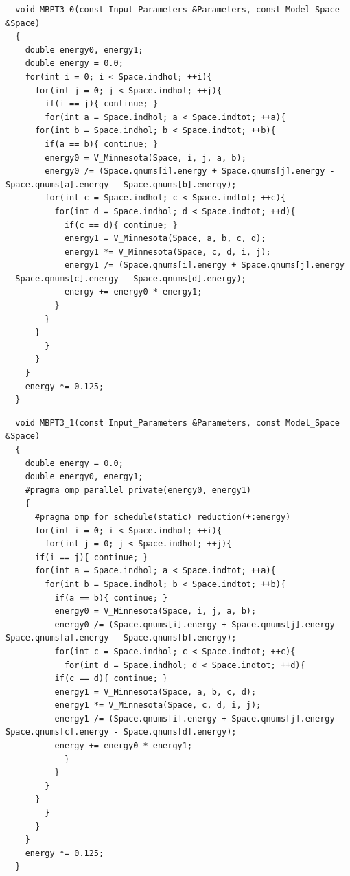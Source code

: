 \begin{lstlisting}
  void MBPT3_0(const Input_Parameters &Parameters, const Model_Space &Space)
  {
    double energy0, energy1;
    double energy = 0.0;
    for(int i = 0; i < Space.indhol; ++i){
      for(int j = 0; j < Space.indhol; ++j){
        if(i == j){ continue; }
        for(int a = Space.indhol; a < Space.indtot; ++a){
	  for(int b = Space.indhol; b < Space.indtot; ++b){
	    if(a == b){ continue; }
	    energy0 = V_Minnesota(Space, i, j, a, b);
	    energy0 /= (Space.qnums[i].energy + Space.qnums[j].energy - Space.qnums[a].energy - Space.qnums[b].energy);
	    for(int c = Space.indhol; c < Space.indtot; ++c){
	      for(int d = Space.indhol; d < Space.indtot; ++d){
	        if(c == d){ continue; }
	        energy1 = V_Minnesota(Space, a, b, c, d);
	        energy1 *= V_Minnesota(Space, c, d, i, j);
	        energy1 /= (Space.qnums[i].energy + Space.qnums[j].energy - Space.qnums[c].energy - Space.qnums[d].energy);
	        energy += energy0 * energy1;
	      }
	    }
	  }
        }
      }
    }
    energy *= 0.125;
  }
\end{lstlisting}

\begin{lstlisting}
  void MBPT3_1(const Input_Parameters &Parameters, const Model_Space &Space)
  {
    double energy = 0.0;
    double energy0, energy1;
    #pragma omp parallel private(energy0, energy1)
    {
      #pragma omp for schedule(static) reduction(+:energy)
      for(int i = 0; i < Space.indhol; ++i){
        for(int j = 0; j < Space.indhol; ++j){
	  if(i == j){ continue; }
	  for(int a = Space.indhol; a < Space.indtot; ++a){
	    for(int b = Space.indhol; b < Space.indtot; ++b){
	      if(a == b){ continue; }
	      energy0 = V_Minnesota(Space, i, j, a, b);
	      energy0 /= (Space.qnums[i].energy + Space.qnums[j].energy - Space.qnums[a].energy - Space.qnums[b].energy);
	      for(int c = Space.indhol; c < Space.indtot; ++c){
	        for(int d = Space.indhol; d < Space.indtot; ++d){
		  if(c == d){ continue; }
		  energy1 = V_Minnesota(Space, a, b, c, d);
		  energy1 *= V_Minnesota(Space, c, d, i, j);
		  energy1 /= (Space.qnums[i].energy + Space.qnums[j].energy - Space.qnums[c].energy - Space.qnums[d].energy);
		  energy += energy0 * energy1;
	        }
	      }
	    }
	  }
        }
      }
    }
    energy *= 0.125;
  }
\end{lstlisting}


